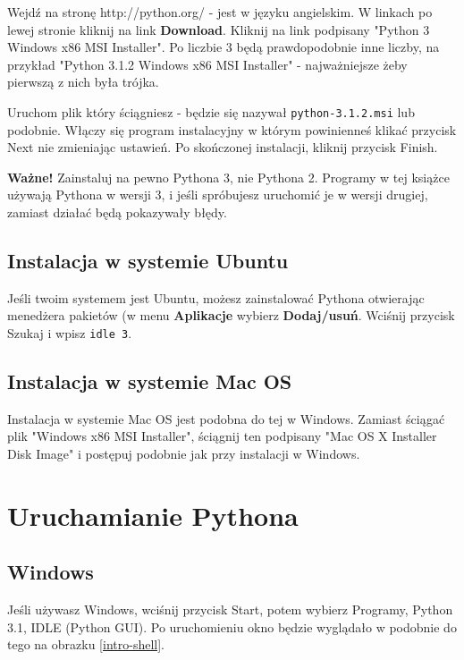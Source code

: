 \documentclass{book}
\begin{document}
Wejdź na stronę http://python.org/ - jest w języku angielskim. W linkach po lewej stronie kliknij na link {\bf Download}. Kliknij na link podpisany "Python 3 Windows x86 MSI Installer". Po liczbie 3 będą prawdopodobnie inne liczby, na przykład "Python 3.1.2 Windows x86 MSI Installer" - najważniejsze żeby pierwszą z nich była trójka. 

Uruchom plik który ściągniesz - będzie się nazywał \lstinline{python-3.1.2.msi} lub podobnie. Włączy się program instalacyjny w którym powinienneś klikać przycisk Next nie zmieniając ustawień. Po skończonej instalacji, kliknij przycisk Finish.

{\bf Ważne!} Zainstaluj na pewno Pythona 3, nie Pythona 2. Programy w tej książce używają Pythona w wersji 3, i jeśli spróbujesz uruchomić je w wersji drugiej, zamiast działać będą pokazywały błędy.

\subsection{Instalacja w systemie Ubuntu}

Jeśli twoim systemem jest Ubuntu, możesz zainstalować Pythona otwierając menedżera pakietów (w menu {\bf Aplikacje} wybierz {\bf Dodaj/usuń}.  Wciśnij przycisk Szukaj i wpisz \lstinline{idle 3}. 

\subsection{Instalacja w systemie Mac OS}

Instalacja w systemie Mac OS jest podobna do tej w Windows. Zamiast ściągać plik "Windows x86 MSI Installer", ściągnij ten podpisany "Mac OS X Installer Disk Image" i postępuj podobnie jak przy instalacji w Windows.


\section{Uruchamianie Pythona}

\subsection{Windows}

Jeśli używasz Windows, wciśnij przycisk Start, potem wybierz Programy, Python 3.1, IDLE (Python GUI). Po uruchomieniu okno będzie wyglądało w podobnie do tego na obrazku \ref{intro-shell}.
\end{document}
